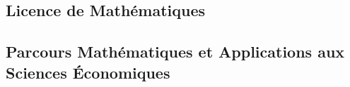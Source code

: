 \documentclass[10pt, a5paper]{report}
\begin{document}
\begin{spacing}{1.5}

\chapter*{Licence de Mathématiques}

\vfill
\section*{Parcours Mathématiques et Applications aux Sciences \'Economiques}
\vfill


\end{spacing}
\end{document}
